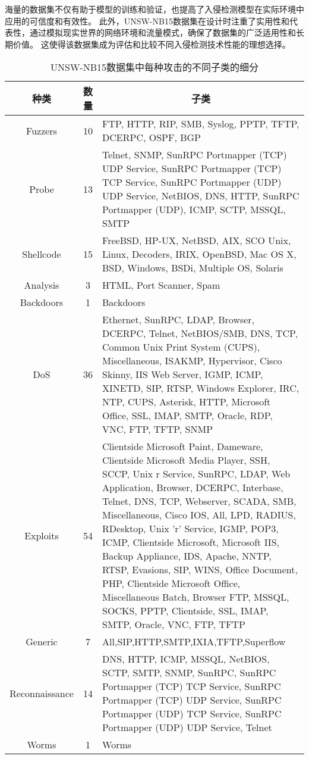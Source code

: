 海量的数据集不仅有助于模型的训练和验证，也提高了入侵检测模型在实际环境中应用的可信度和有效性。
此外，UNSW-NB15数据集在设计时注重了实用性和代表性，通过模拟现实世界的网络环境和流量模式，确保了数据集的广泛适用性和长期价值。
这使得该数据集成为评估和比较不同入侵检测技术性能的理想选择。
\begin{table}[htbp]
  \caption{UNSW-NB15数据集中每种攻击的不同子类的细分}
  \label{tab:UNSW-NB15_class}
  \begin{tabularx}{\textwidth}{@{}ccX@{}}
  \toprule
    \multicolumn{1}{c}{\textbf{种类}} & \multicolumn{1}{c}{\textbf{数量}} & \multicolumn{1}{c}{\textbf{子类}}\\
  \midrule
    Fuzzers & 10 & FTP, HTTP, RIP, SMB, Syslog, PPTP, TFTP, DCERPC, OSPF, BGP\\
    Probe & 13 & Telnet, SNMP, SunRPC Portmapper (TCP) UDP Service, SunRPC Portmapper (TCP) TCP Service, SunRPC Portmapper (UDP) UDP Service, NetBIOS, DNS, HTTP,
    SunRPC Portmapper (UDP), ICMP, SCTP, MSSQL, SMTP\\
    Shellcode & 15 & FreeBSD, HP-UX, NetBSD, AIX, SCO Unix, Linux, Decoders, IRIX, OpenBSD, Mac OS X, BSD, Windows, BSDi, Multiple OS, Solaris\\
    Analysis & 3 & HTML, Port Scanner, Spam\\
    Backdoors & 1 & Backdoors\\
    DoS & 36 & Ethernet, SunRPC, LDAP, Browser, DCERPC, Telnet, NetBIOS/SMB, DNS, TCP, Common Unix Print System (CUPS), Miscellaneous, ISAKMP, Hypervisor, 
    Cisco Skinny, IIS Web Server, IGMP, ICMP, XINETD, SIP, RTSP, Windows Explorer, IRC, NTP, CUPS, Asterisk, HTTP, Microsoft Office, SSL, IMAP, SMTP, Oracle, RDP, VNC, FTP, TFTP, SNMP\\
    Exploits & 54 &Clientside Microsoft Paint, Dameware, Clientside Microsoft Media Player, SSH, SCCP, Unix r Service, SunRPC, LDAP, Web Application, Browser, DCERPC, Interbase, Telnet, DNS, TCP, Webserver, SCADA, SMB, Miscellaneous, Cisco IOS, All, LPD, RADIUS, RDesktop, Unix 'r' Service, IGMP, POP3, ICMP, Clientside Microsoft, Microsoft IIS, Backup Appliance, IDS, Apache, NNTP, RTSP, Evasions, SIP, WINS, Office Document, PHP, Clientside Microsoft Office, Miscellaneous Batch, Browser FTP, MSSQL, SOCKS, PPTP, Clientside, SSL, IMAP, SMTP, Oracle, VNC, FTP, TFTP\\
    Generic& 7 &All,SIP,HTTP,SMTP,IXIA,TFTP,Superflow\\
    Reconnaissance& 14 &DNS, HTTP, ICMP, MSSQL, NetBIOS, SCTP, SMTP, SNMP, SunRPC, SunRPC Portmapper (TCP) TCP Service, SunRPC Portmapper (TCP) UDP Service, SunRPC Portmapper (UDP) TCP Service, SunRPC Portmapper (UDP) UDP Service, Telnet\\
    Worms&1&Worms\\
    \bottomrule
  \end{tabularx}
\end{table}
